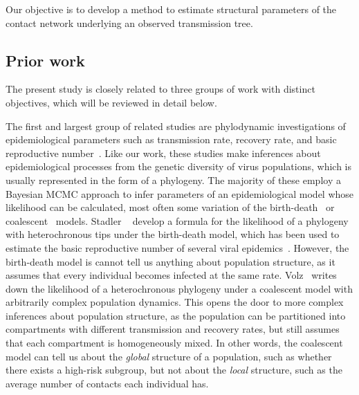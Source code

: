 Our objective is to develop a method to estimate structural parameters of the
contact network underlying an observed transmission tree.

\subsection{Prior work}

The present study is closely related to three groups of work with distinct
objectives, which will be reviewed in detail below. 

The first and largest group of related studies are phylodynamic investigations
of epidemiological parameters such as transmission rate, recovery rate, and
basic reproductive number~\autocite{pybus2009evolutionary, volz2013viral}. Like
our work, these studies make inferences about epidemiological processes from
the genetic diversity of virus populations, which is usually represented in the
form of a phylogeny. The majority of these employ a Bayesian \gls{MCMC}
approach to infer parameters of an epidemiological model whose likelihood can
be calculated, most often some variation of the
birth-death~\autocite{kendall1948generalized} or
coalescent~\autocite{kingman1982coalescent} models. Stadler
\etal~\autocite{stadler2011estimating} develop a formula for the likelihood of
a phylogeny with heterochronous tips under the birth-death model, which has
been used to estimate the basic reproductive number of several viral
epidemics~\autocite{stadler2011estimating}. However, the birth-death model is
cannot tell us anything about population structure, as it assumes that every
individual becomes infected at the same rate. Volz~\autocite{volz2012complex}
writes down the likelihood of a heterochronous phylogeny under a coalescent
model with arbitrarily complex population dynamics. This opens the door to more
complex inferences about population structure, as the population can be
partitioned into compartments with different transmission and recovery rates,
but still assumes that each compartment is homogeneously mixed. In other words,
the coalescent model can tell us about the \emph{global} structure of a
population, such as whether there exists a high-risk subgroup, but not about
the \emph{local} structure, such as the average number of contacts each
individual has. 

